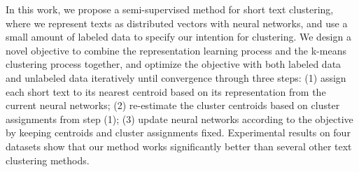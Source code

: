 In this work, we propose a semi-supervised method for short text clustering, where we represent texts as distributed vectors with neural networks, and use a small amount of labeled data to specify our intention for clustering. We design a novel objective to combine the representation learning process and the k-means clustering process together, and optimize the objective with both labeled data and unlabeled data iteratively until convergence through three steps: (1) assign each short text to its nearest centroid based on its representation from the current neural networks; (2) re-estimate the cluster centroids based on cluster assignments from step (1); (3) update neural networks according to the objective by keeping centroids and cluster assignments fixed. Experimental results on four datasets show that our method works significantly better than several other text clustering methods.
